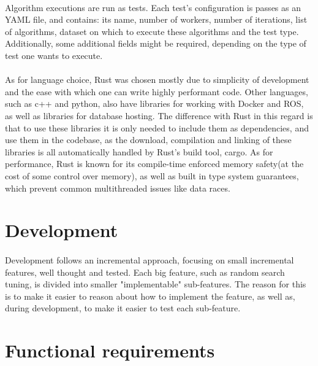 \paragraph{}Algorithm executions are run as tests. Each test's configuration is passes as an YAML file, and contains: its name, number of workers, number of iterations, list of algorithms, dataset on which to execute these algorithms and the test type. Additionally, some additional fields might be required, depending on the type of test one wants to execute.

\paragraph{}As for language choice, Rust was chosen mostly due to simplicity of development and the ease with which one can write highly performant code. Other languages, such as c++ and python, also have libraries for working with Docker and ROS, as well as libraries for database hosting. The difference with Rust in this regard is that to use these libraries it is only needed to include them as dependencies, and use them in the codebase, as the download, compilation and linking of these libraries is all automatically handled by Rust's build tool, cargo. As for performance, Rust is known for its compile-time enforced memory safety(at the cost of some control over memory), as well as built in type system guarantees, which prevent common multithreaded issues like data races.

\section{Development}
\paragraph{}Development follows an incremental approach, focusing on small incremental features, well thought and tested. Each big feature, such as random search tuning, is divided into smaller "implementable" sub-features. The reason for this is to make it easier to reason about how to implement the feature, as well as, during development, to make it easier to test each sub-feature.

\section{Functional requirements}

